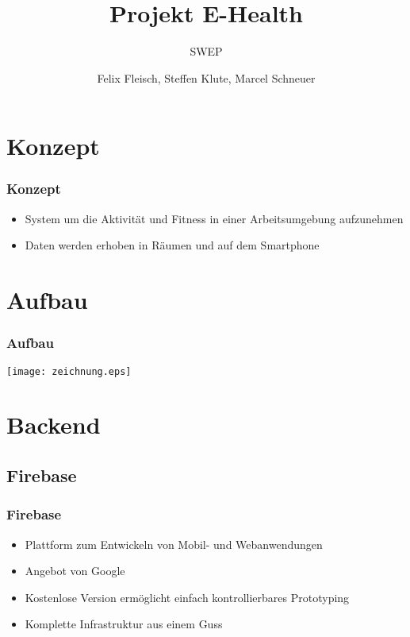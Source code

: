 \documentclass[11pt]{beamer}
\begin{document}
	\author{Felix Fleisch, Steffen Klute, Marcel Schneuer}
	\title{Projekt E-Health}
	\subtitle{SWEP}
	\begin{frame}[plain]
	\maketitle
\end{frame}


\section{Konzept}



\begin{frame}
\frametitle{Konzept}

\begin{itemize}
	\item System um die Aktivität und Fitness in einer Arbeitsumgebung aufzunehmen
	\item Daten werden erhoben in Räumen und auf dem Smartphone
\end{itemize}

\end{frame}



\section{Aufbau}
\begin{frame}
\frametitle{Aufbau}
\begin{centering}
	\hspace*{1.5 cm}\texttt{[image: zeichnung.eps]}
\end{centering}

\end{frame}


\section{Backend}

\subsection{Firebase}
\begin{frame}
\frametitle{Firebase}
\begin{itemize}
\item Plattform zum Entwickeln von Mobil- und Webanwendungen
\item Angebot von Google
\item Kostenlose Version ermöglicht einfach kontrollierbares Prototyping
\item Komplette Infrastruktur aus einem Guss
\end{itemize}

\end{frame}
\end{document}
